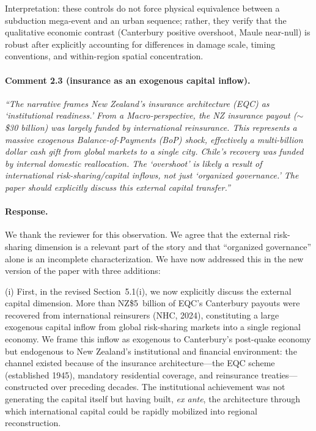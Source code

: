 Interpretation: these controls do not force physical equivalence between a subduction mega-event and an urban sequence; rather, they verify that the qualitative economic contrast (Canterbury positive overshoot, Maule near-null) is robust after explicitly accounting for differences in damage scale, timing conventions, and within-region spatial concentration.

\paragraph{Comment 2.3 (insurance as an exogenous capital inflow).}
\textit{``The narrative frames New Zealand's insurance architecture (EQC) as `institutional readiness.' From a Macro-perspective, the NZ insurance payout ($\sim$\$30 billion) was largely funded by international reinsurance. This represents a massive exogenous Balance-of-Payments (BoP) shock, effectively a multi-billion dollar cash gift from global markets to a single city. Chile's recovery was funded by internal domestic reallocation. The `overshoot' is likely a result of international risk-sharing/capital inflows, not just `organized governance.' The paper should explicitly discuss this external capital transfer.''}

\paragraph{Response.} We thank the reviewer for this observation. We agree that the external risk-sharing dimension is a relevant part of the story and that ``organized governance'' alone is an incomplete characterization. We have now addressed this in the new version of the paper with three additions:

(i) First, in the revised Section~5.1(i), we now explicitly discuss the external capital dimension. More than NZ\$5~billion of EQC's Canterbury payouts were recovered from international reinsurers (NHC, 2024), constituting a large exogenous capital inflow from global risk-sharing markets into a single regional economy. We frame this inflow as exogenous to Canterbury's post-quake economy but endogenous to New Zealand's institutional and financial environment: the channel existed because of the insurance architecture---the EQC scheme (established 1945), mandatory residential coverage, and reinsurance treaties---constructed over preceding decades. The institutional achievement was not generating the capital itself but having built, \textit{ex ante}, the architecture through which international capital could be rapidly mobilized into regional reconstruction.

